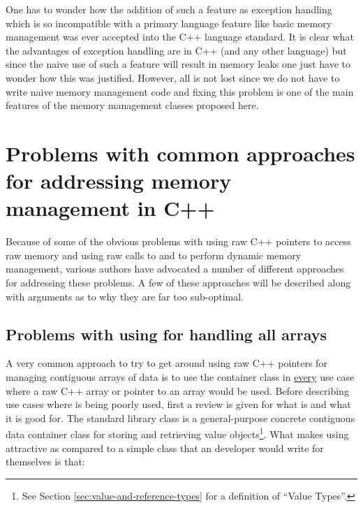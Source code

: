 \documentclass[pdf,ps2pdf,11pt]{SANDreport}
\begin{document}
One has to wonder how the addition of such a feature as exception
handling which is so incompatible with a primary language feature like
basic memory management was ever accepted into the C++ language
standard.  It is clear what the advantages of exception handling are
in C++ (and any other language) but since the naive use of such a
feature will result in memory leaks one just have to wonder how this
was justified.  However, all is not lost since we do not have to write
naive memory management code and fixing this problem is one of the
main features of the memory management classes proposed here.


%
{}\section{Problems with common approaches for addressing memory
management in C++}
\label{sec:current-appraoches-to-mem-mng}
%

Because of some of the obvious problems with using raw C++ pointers to
access raw memory and using raw calls to {} and
{} to perform dynamic memory management, various authors
have advocated a number of different approaches for addressing these
problems.  A few of these approaches will be described along with
arguments as to why they are far too sub-optimal.


%
{}\subsection{Problems with using {} for handling
all arrays}
%

A very common approach to try to get around using raw C++ pointers for
managing contiguous arrays of data is to use the container class
{} in {}\underline{every} use case where a raw C++
array or pointer to an array would be used.  Before describing use
cases where {} is being poorly used, first a review
is given for what {} is and what it is good for.  The
standard library class {} is a general-purpose
concrete contiguous data container class for storing and retrieving
value objects\footnote{See Section
{}\ref{sec:value-and-reference-types} for a definition of ``Value
Types''.}.  What makes using {} attractive as
compared to a simple class that an developer would write for
themselves is that:
\end{document}
